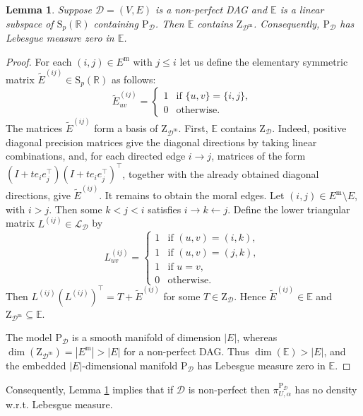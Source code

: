 \documentclass[12pt]{article}
\newcommand{\R}{\mathbb{R}}
\newcommand{\D}{\mathcal{D}}
\theoremstyle{plain}
\newtheorem{lemma}[theorem]{Lemma}
\theoremstyle{definition}
\theoremstyle{remark}
\begin{document}
\begin{lemma}\label{lem:not_open}
Suppose $\D=(V,E)$ is a non-perfect DAG and $\mathbb{E}$ is a linear
subspace of $\mathrm{S}_p(\mathbb{R})$ containing $\mathrm{P}_{\D}$.  Then
$\mathbb{E}$ contains $\mathrm{Z}_{\D^{\mathrm m}}$.  Consequently,
$\mathrm{P}_{\D}$ has Lebesgue measure zero in $\mathbb{E}$.
  \end{lemma}
  \begin{proof}
 For each $(i, j)\in E^{\mathrm{m}}$  with $j\leq i$ let us define the elementary symmetric matrix  $\widetilde{E}^{(ij)}\in \mathrm{S}_{p}(\R)$ as follows:
  \[
   \widetilde{E}^{(ij)}_{uv}=
  \begin{cases}
 1& \text{if  $\{u, v\}=\{i,j\}$, }\\
 0& \text{otherwise.}
  \end{cases}
  \]
The matrices $\widetilde{E}^{(ij)}$ form a basis of
$\mathrm{Z}_{\D^{\mathrm m}}$.  First, $\mathbb{E}$ contains
$\mathrm{Z}_{\D}$.  Indeed, positive diagonal precision matrices give the
diagonal directions by taking linear combinations, and, for each directed
edge $i\to j$, matrices of the form
$(I+t e_i e_j^{\top})(I+t e_i e_j^{\top})^{\top}$, together with the already
obtained diagonal directions, give $\widetilde E^{(ij)}$.  It remains to
obtain the moral edges.  Let $(i,j)\in E^{\mathrm m}\setminus E$, with
$i>j$.  Then some $k<j<i$ satisfies $i\to k\leftarrow j$.  Define the lower
triangular matrix $L^{(ij)}\in\mathcal{L}_{\D}$ by
  \[
      L^{(ij)}_{uv}=
  \begin{cases}
 1& \text{if  $(u, v)=(i,k)$, }\\
 1&  \text{if  $(u, v)=(j,k)$, }\\
 1& \text{if  $u=v$, }\\
 0& \text{otherwise.}
  \end{cases} 
  \]
Then
$L^{(ij)}(L^{(ij)})^{\top}=T+\widetilde{E}^{(ij)}$ for some
$T\in\mathrm{Z}_{\D}$.  Hence $\widetilde{E}^{(ij)}\in\mathbb{E}$ and
$\mathrm{Z}_{\D^{\mathrm m}}\subseteq\mathbb{E}$.
 
The model $\mathrm{P}_{\D}$ is a smooth manifold of dimension $|E|$,
whereas $\dim(\mathrm{Z}_{\D^{\mathrm m}})=|E^{\mathrm m}|>|E|$ for a
non-perfect DAG.  Thus $\dim(\mathbb{E})>|E|$, and the embedded
$|E|$-dimensional manifold $\mathrm{P}_{\D}$ has Lebesgue measure zero in
$\mathbb{E}$.
\end{proof}
%
Consequently, Lemma \ref{lem:not_open}  implies that  if $\D$ is non-perfect then $\pi^{\mathrm{P}_{\D}}_{U,\alpha}$  has no density w.r.t. Lebesgue measure. 
\end{document}
